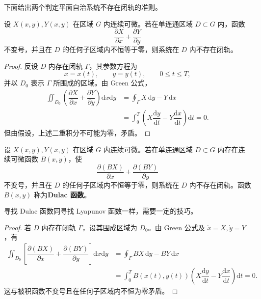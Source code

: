 下面给出两个判定平面自治系统不存在闭轨的准则。

\begin{theorem}[Bendixson 判据]
	\label{thm:Bendixson判据}
	设 $X(x,y),Y(x,y)$ 在区域 $G$ 内连续可微。若在单连通区域 $D\subset G$ 内，函数
	\[
		\dfrac{\partial X}{\partial x}+\dfrac{\partial Y}{\partial y}
	\]
	不变号，并且在 $D$ 的任何子区域内不恒等于零，则系统在 $D$ 内不存在闭轨。
\end{theorem}

\begin{proof}
	反设 $D$ 内存在闭轨 $\Gamma$，其参数方程为
	\[
		x=x(t),\qquad y=y(t),\qquad 0\leqslant t\leqslant T,
	\]
	并以 $D_0$ 表示 $\Gamma$ 所围成的区域。由 Green 公式，
	\[
		\begin{aligned}
			\iint_{D_0}\left(
			\dfrac{\partial X}{\partial x}
			+\dfrac{\partial Y}{\partial y}\right)\mathrm dx\mathrm dy
			&=\oint_{\Gamma}X\,\mathrm dy-Y\,\mathrm dx\\
			&=\int_0^T\left(X\dfrac{\mathrm dy}{\mathrm dt}
			-Y\dfrac{\mathrm dx}{\mathrm dt}\right)\mathrm dt=0.
		\end{aligned}
	\]
	但由假设，上述二重积分不可能为零，矛盾。
\end{proof}

\begin{theorem}[Dulac 判据]
	\label{thm:Dulac判据}
	设 $X(x,y),Y(x,y)$ 在区域 $G$ 内连续可微。若在单连通区域 $D\subset G$ 内存在连续可微函数 $B(x,y)$，使
	\[
		\dfrac{\partial(BX)}{\partial x}
		+\dfrac{\partial(BY)}{\partial y}
	\]
	不变号，并且在 $D$ 的任何子区域内不恒等于零，则系统在 $D$ 内不存在闭轨。函数 $B(x,y)$ 称为\textbf{Dulac 函数}。
\end{theorem}

寻找 Dulac 函数同寻找 Lyapunov 函数一样，需要一定的技巧。

\begin{proof}
	若 $D$ 内存在闭轨 $\Gamma$，设其围成区域为 $D_0$。由 Green 公式及 $\dot x=X,\dot y=Y$，有
	\[
		\begin{aligned}
			\iint_{D_0}\left[
			\dfrac{\partial(BX)}{\partial x}
			+\dfrac{\partial(BY)}{\partial y}\right]\mathrm dx\mathrm dy
			&=\oint_{\Gamma}BX\,\mathrm dy-BY\,\mathrm dx\\
			&=\int_0^T B(x(t),y(t))
			\left(X\dfrac{\mathrm dy}{\mathrm dt}
			-Y\dfrac{\mathrm dx}{\mathrm dt}\right)\mathrm dt=0.
		\end{aligned}
	\]
	这与被积函数不变号且在任何子区域内不恒为零矛盾。
\end{proof}


